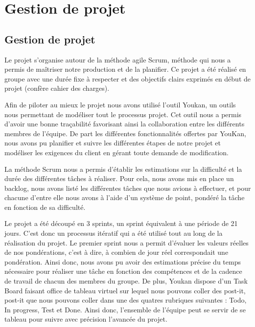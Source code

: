 \chapter{Gestion de projet}
\minitoc

\section{Gestion de projet}

Le projet s'organise autour de la méthode agile Scrum, méthode qui nous a permis de maîtriser notre production et de la planifier. Ce projet a été réalisé en groupe avec une durée fixe à respecter et des objectifs clairs exprimés en début de projet (confère cahier des charges).

Afin de piloter au mieux le projet nous avons utilisé l'outil Youkan, un outils nous permettant de modéliser tout le processus projet. Cet outil nous a permis d'avoir une bonne traçabilité favorisant ainsi la collaboration entre les différents membres de l'équipe.
De part les différentes fonctionnalités offertes par YouKan, nous avons pu planifier et suivre les différentes étapes de notre projet et modéliser les exigences du client en gérant toute demande de modification.

La méthode Scrum nous a permis d'établir les estimations sur la difficulté et la durée des différentes tâches à réaliser. Pour cela, nous avons mis en place un backlog, nous avons listé les différentes tâches que nous avions à effectuer, et pour chacune d'entre elle nous avons à l'aide d'un système de point, pondéré la tâche en fonction de sa difficulté. 

Le projet a été découpé en 3 sprints, un sprint équivalent à une période de 21 jours. C'est donc un processus itératif qui a été utilisé tout au long de la réalisation du projet. Le premier sprint nous a permit d'évaluer les valeurs réelles de nos pondérations, c'est à dire, à combien de jour réel correspondait une pondération. Ainsi donc, nous avons pu avoir des estimations précise du temps nécessaire pour réaliser une tâche en fonction des compétences et de la cadence de travail de chacun des membres du groupe. 
De plus, Youkan dispose d'un Task Board faisant office de tableau virtuel sur lequel nous pouvons coller des post-it, post-it que nous pouvons coller dans une des quatres rubriques suivantes : Todo, In progress, Test et Done. Ainsi donc, l'ensemble de l'équipe peut se servir de se tableau pour suivre avec précision l'avancée du projet.

